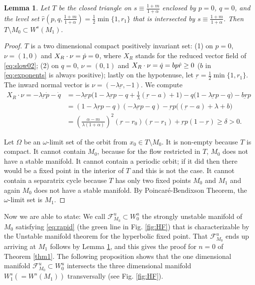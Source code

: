 \documentclass[11pt]{article}
\newtheorem{lemma}{Lemma}[section]
\theoremstyle{remark}
\begin{document}
\begin{lemma} \label{lem:T}
 Let $T$ be the closed triangle on $s\equiv \frac{1+m}{1+\alpha}$ enclosed by $p=0$, $q=0$, and the level set $\hat{r}(p,q,\frac{1+m}{1+\alpha})= \frac{1}{2}\min\{1,r_1\}$ that is intersected by $s\equiv \frac{1+m}{1+\alpha}$.
 Then $T\setminus M_0 \subset W^s(M_1)$.
\end{lemma}
\begin{proof}
$T$ is a two dimensional compact positively invariant set: (1) on $p=0$, $\nu = (1,0)$ and $X_R\cdot\nobreak\nu = \dot{p}=0$, where $X_R$ stands for the reduced vector field of \eqref{eq:slow02};
 (2) on $q=0$, $\nu = (0,1)$ and $X_R\cdot\nobreak\nu=\dot{q} = bp\hat{r}\ge0$ ($b$ in \eqref{eq:exponents} is always positive); lastly on the hypotenuse, let $\underbar{r}=\frac{1}{2}\min\{1,r_1\}$. The inward normal vector is $\nu = (-\lambda\underbar{r}, -1)$. We compute
  \begin{align}
  X_R\cdot\nu=-\lambda\underbar{r}\dot{p} -\dot{q}&= -\lambda \underbar{r}p \Big(1-\lambda \underbar{r}p -q + \frac{1}{\lambda}(\underbar{r}-a)+1\Big) - q(1-\lambda \underbar{r}p -q\big) - b \underbar{r}p \nonumber\\
  &= (1-\lambda \underbar{r}p -q)(-\lambda \underbar{r}p -q) -\underbar{r}p\Big((\underbar{r}-a)+\lambda+b\Big)\nonumber\\
  &= \left(\frac{\alpha-m}{\lambda(1+\alpha)}\right)^2(\underbar{r}-r_0)(\underbar{r}-r_1)+\underbar{r}p(1-\underbar{r})\ge \delta>0. \label{eq:affine}
 \end{align}

Let $\Omega$ be an $\omega$-limit set of the orbit from $x_0\in T\setminus M_0$. It is non-empty because $T$ is compact.
 It cannot contain $M_0$, because for the flow restricted in $T$, $M_0$ does not have  a stable manifold. It cannot contain a periodic orbit; if it did then there would be a fixed point in the interior of $T$ and this is not the case.
It cannot contain a separatrix cycle because $T$ has only two fixed points $M_0$ and $M_1$ and again $M_0$ does not have  a stable manifold.  By Poincar\'e-Bendixson Theorem, the $\omega$-limit set is $M_1$.
\end{proof}


Now we are able to state: We call $\mathcal{F}^u_{M_0}\subset W^u_0$ the strongly unstable manifold of $M_0$ satisfying \eqref{eq:rapid} (the green line in Fig. \ref{fig:HF}) that is characterizable by the Unstable manifold theorem for the hyperbolic fixed point. That $\mathcal{F}^u_{M_0}$ ends up arriving at $M_1$
follows by Lemma \ref{lem:T}, and this gives the proof for $n=0$ of Theorem \ref{thm1}. The following proposition shows that the one dimensional manifold $\mathcal{F}^u_{M_0}\subset W^u_0$ intersects the three dimensional manifold $W_1^s(=W^s(M_1))$ transversally (see Fig. \ref{fig:HF}).
\end{document}
